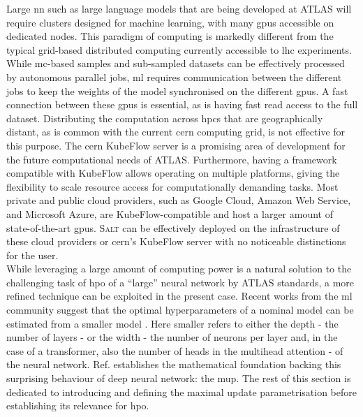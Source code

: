 Large \gls{nn} such as large language models that are being developed at ATLAS will require clusters designed for machine learning, with many \glspl{gpu} accessible on dedicated nodes. This paradigm of computing is markedly different from the typical grid-based distributed computing currently accessible to \gls{lhc} experiments. While \gls{mc}-based samples and sub-sampled datasets can be effectively processed by autonomous parallel jobs, \gls{ml} requires communication between the different jobs to keep the weights of the model synchronised on the different \glspl{gpu}. A fast connection between these \glspl{gpu} is essential, as is having fast read access to the full dataset. Distributing the computation across \glspl{hpc} that are geographically distant, as is common with the current \gls{cern} computing grid, is not effective for this purpose. The \gls{cern} KubeFlow server is a promising area of development for the future computational needs of ATLAS. Furthermore, having a framework compatible with KubeFlow allows operating on multiple platforms, giving the flexibility to scale resource access for computationally demanding tasks. Most private and public cloud providers, such as Google Cloud, Amazon Web Service, and Microsoft Azure, are KubeFlow-compatible and host a larger amount of state-of-the-art \glspl{gpu}. \textsc{Salt} can be effectively deployed on the infrastructure of these cloud providers or \gls{cern}'s KubeFlow server with no noticeable distinctions for the user. \\

While leveraging a large amount of computing power is a natural solution to the challenging task of \gls{hpo} of a ``large'' neural network by ATLAS standards, a more refined technique can be exploited in the present case. Recent works from the \gls{ml} community suggest that the optimal hyperparameters of a nominal model can be estimated from a smaller model \cite{yang2021tuning}. Here smaller refers to either the depth - the number of layers - or the width - the number of neurons per layer and, in the case of a transformer, also the number of heads in the multihead attention - of the neural network. Ref. \cite{pmlr-v139-yang21c} establishes the mathematical foundation backing this surprising behaviour of deep neural network: the \gls{mup}. The rest of this section is dedicated to introducing and defining the maximal update parametrisation before establishing its relevance for \gls{hpo}.

